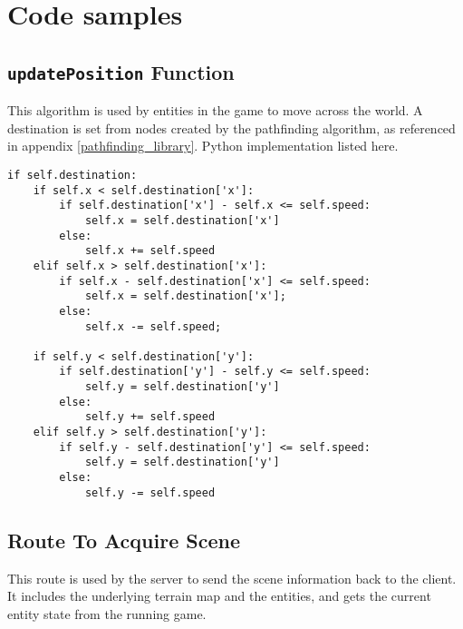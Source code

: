 \chapter{Code samples}

\section{\texttt{updatePosition} Function}\label{update_position}

This algorithm is used by entities in the game to move across the world. A destination is set from nodes created by the pathfinding algorithm, as referenced in appendix \ref{pathfinding_library}. Python implementation listed here.

\noindent
\begin{lstlisting}[style=py, label=updatePosition]
if self.destination:
	if self.x < self.destination['x']:
		if self.destination['x'] - self.x <= self.speed:
			self.x = self.destination['x']
		else:
			self.x += self.speed
	elif self.x > self.destination['x']:
		if self.x - self.destination['x'] <= self.speed:
			self.x = self.destination['x'];
		else:
			self.x -= self.speed;

	if self.y < self.destination['y']:
		if self.destination['y'] - self.y <= self.speed:
			self.y = self.destination['y']
		else:
			self.y += self.speed
	elif self.y > self.destination['y']:
		if self.y - self.destination['y'] <= self.speed:
			self.y = self.destination['y']
		else:
			self.y -= self.speed
\end{lstlisting}

\section{Route To Acquire Scene}\label{scene_route}

This route is used by the server to send the scene information back to the client. It includes the underlying terrain map and the entities, and gets the current entity state from the running game.

